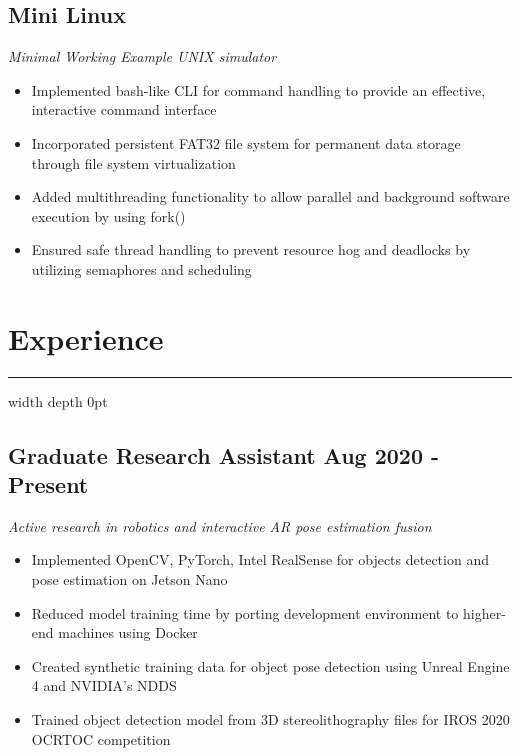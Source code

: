 \documentclass[11pt]{article}
\begin{document}
    \subsection*{Mini Linux}
    \vspace{-0.2cm}
    \textit{Minimal Working Example UNIX simulator}
    \vspace{-0.1cm}
    \begin{itemize}[noitemsep]
        \item Implemented bash-like CLI for command handling to provide an effective, interactive command interface
        \item Incorporated persistent FAT32 file system for permanent data storage through file system virtualization
        \item Added multithreading functionality to allow parallel and background software execution by
        using fork()
        \item Ensured safe thread handling to prevent resource hog and deadlocks by utilizing
        semaphores and scheduling
    \end{itemize}
    \section*{Experience}
    \hrule height 0.5pt width \textwidth depth 0pt \relax
    \vspace{0.1cm}
    \subsection*{Graduate Research Assistant \hfill Aug 2020 - Present} 
    \vspace{-0.2cm}
    \textit{Active research in robotics and interactive AR pose estimation fusion}
    \vspace{-0.1cm}
    \begin{itemize}[noitemsep]
        \item Implemented OpenCV, PyTorch, Intel RealSense for objects detection and pose estimation on Jetson Nano
        \item Reduced model training time by porting development environment to higher-end machines
        using Docker
        \item Created synthetic training data for object pose detection using Unreal Engine 4 and
        NVIDIA's NDDS
        \item Trained object detection model from 3D stereolithography files for IROS 2020 OCRTOC competition 
    \end{itemize}
\end{document}

